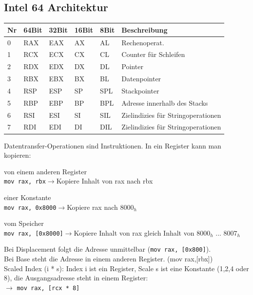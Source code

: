 \documentclass[8pt,landscape,a4paper]{scrartcl}
\newcommand{\drule}[3][0]{%
	\tikz[baseline]{\path[decoration={markings,
			mark=between positions 0 and 1 step 2*#3
			with {\node[fill, circle, minimum width=#3, inner sep=0pt, anchor=south west] {};}},postaction={decorate}]  (0,#1) -- ++(#2,0);}}
\begin{document}
\begin{multicols*}{5}
\section{Intel 64 Architektur}
\vspace{-8pt}
\begin{center}
	\begin{tabular}{p{.1cm}|p{.4cm}|p{.4cm}|p{.4cm}|p{.3cm}|p{1.5cm}}
		Nr&64Bit\centering&32Bit&16Bit&8Bit&Beschreibung\\
		\hline
		0&RAX&EAX&AX&AL&Rechenoperat.\\
		\hline
		1&RCX&ECX&CX&CL&Counter für Schleifen\\
		\hline
		2&RDX&EDX&DX&DL&Pointer\\
		\hline
		3&RBX&EBX&BX&BL&Datenpointer\\
		\hline
		4&RSP&ESP&SP&SPL&Stackpointer\\
		\hline
		5&RBP&EBP&BP&BPL&Adresse innerhalb des Stacks\\
		\hline
		6&RSI&ESI&SI&SIL&Zielindizies für Stringoperationen\\
		\hline
		7&RDI&EDI&DI&DIL&Zielindizies für Stringoperationen\\
	\end{tabular}	
\end{center}
\vspace{-8pt}
\textcolor{b}{Datentransfer-Operationen} sind Instruktionen. In ein Register kann man kopieren:
\begin{compactitem} [$\bullet$]
	\item von einem \textcolor{b}{anderen Register}\\
	\texttt{mov rax, rbx}$\rightarrow$Kopiere Inhalt von rax nach rbx
	\item einer \textcolor{b}{Konstante}\\
	\texttt{mov rax, 0x8000}$\rightarrow$Kopiere rax nach $8000_h$
	\item vom \textcolor{b}{Speicher}\\
	\texttt{mov rax, [0x8000]}$\rightarrow$Kopiere Inhalt von rax gleich Inhalt von $8000_h$ ... $8007_h$
\end{compactitem}
\vspace{-4pt}
\drule{5.5cm}{1pt}
Bei \textcolor{b}{Displacement} folgt die Adresse unmittelbar (\texttt{mov rax, [0x800]}).\\
Bei \textcolor{b}{Base} steht die Adresse in einem anderen Register. (mov rax,[rbx])\\
\textcolor{b}{Scaled Index (i * s)}: Index i ist ein Register, Scale s ist eine Konstante (1,2,4 oder 8), die Ausgangsadresse steht in einem Register:\\
$\rightarrow$ \texttt{mov rax, [rcx * 8]}
\vspace{-5pt}

\end{multicols*}
\end{document}
